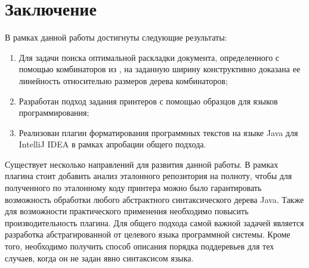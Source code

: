 \section*{Заключение}


В рамках данной работы достигнуты следующие результаты:
\begin{enumerate}
\item Для задачи поиска оптимальной раскладки документа,
определенного с помощью комбинаторов из \cite{swierstra}, на заданную ширину
конструктивно доказана ее линейность относительно размеров дерева комбинаторов;
\item Разработан подход задания принтеров с помощью образцов для языков программирования;
\item Реализован плагин форматирования программных текстов на языке Java для IntelliJ IDEA
в рамках апробации общего подхода.
\end{enumerate}



Существует несколько направлений для развития данной работы.
В рамках плагина стоит добавить
анализ эталонного репозитория на полноту, чтобы для полученного по
эталонному коду принтера можно было гарантировать возможность
обработки любого абстрактного синтаксического дерева Java.
Также для возможности практического применения необходимо повысить
производительность плагина.
Для общего подхода самой важной задачей является разработка
абстрагированной от целевого языка программной системы. Кроме того,
необходимо получить способ описания порядка поддеревьев для тех
случаев, когда он не задан явно синтаксисом языка.
